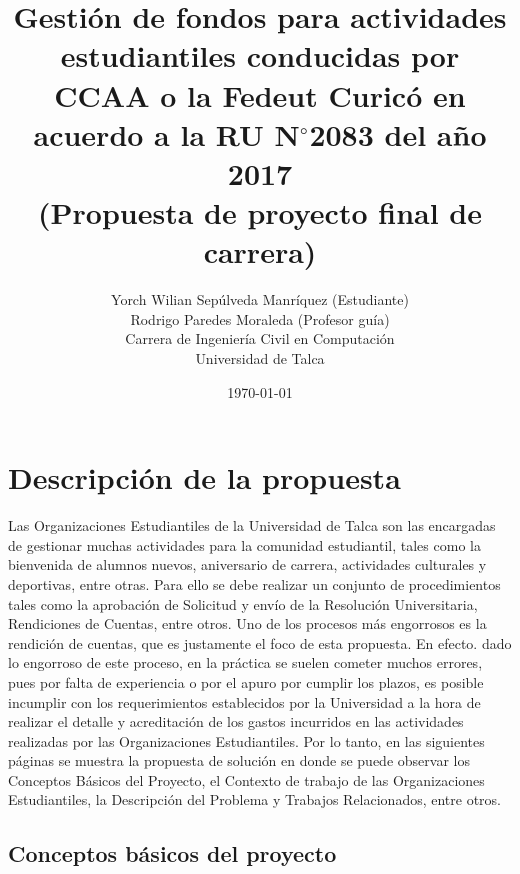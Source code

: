\documentclass[11pt,letterpaper]{article}
\newcommand{\grad}{$^{\circ}$}
\begin{document}
\pagestyle{empty}

\title{
    Gestión de fondos para actividades estudiantiles conducidas por CCAA o la Fedeut Curicó en acuerdo a la RU N\grad 2083 del año 2017\\
    (Propuesta de proyecto final de carrera)}

\author{
Yorch Wilian Sepúlveda Manríquez (Estudiante)\\
Rodrigo Paredes Moraleda (Profesor guía)\\
Carrera de Ingeniería Civil en Computación\\ 
Universidad de Talca}

\date{\today}

\maketitle


\section{Descripción de la propuesta}

Las Organizaciones Estudiantiles de la Universidad de Talca son las encargadas de gestionar muchas actividades para la comunidad estudiantil, tales como la bienvenida de alumnos nuevos, aniversario de carrera, actividades culturales y deportivas, entre otras. Para ello se debe realizar un conjunto de procedimientos tales como la aprobación de Solicitud y envío de la Resolución Universitaria, Rendiciones de Cuentas, entre otros. Uno de los procesos más engorrosos es la rendición de cuentas, que es justamente el foco de esta propuesta. En efecto. dado lo engorroso de este proceso, en la práctica se suelen cometer muchos errores, pues por falta de experiencia o por el apuro por cumplir los plazos, es posible incumplir con los requerimientos establecidos por la Universidad a la hora de realizar el detalle y acreditación de los gastos incurridos en las actividades realizadas por las Organizaciones Estudiantiles. Por lo tanto, en las siguientes páginas se muestra la propuesta de solución en donde se puede observar los Conceptos Básicos del Proyecto, el Contexto de trabajo de las Organizaciones Estudiantiles, la Descripción del Problema y Trabajos Relacionados, entre otros.

\subsection{Conceptos básicos del proyecto} 

\end{document}

